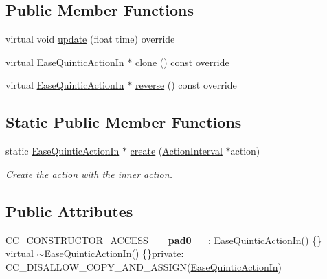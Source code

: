 \subsection*{Public Member Functions}
\begin{DoxyCompactItemize}
\item 
virtual void \hyperlink{classEaseQuinticActionIn_a168f914597d873e6071d39118f2cf9f5}{update} (float time) override
\item 
virtual \hyperlink{classEaseQuinticActionIn}{Ease\+Quintic\+Action\+In} $\ast$ \hyperlink{classEaseQuinticActionIn_a181a8206b5d3bd9aedf4c8ba88087c6c}{clone} () const override
\item 
virtual \hyperlink{classEaseQuinticActionIn}{Ease\+Quintic\+Action\+In} $\ast$ \hyperlink{classEaseQuinticActionIn_a7f99df08baa80e8f09e0fbde4d143696}{reverse} () const override
\end{DoxyCompactItemize}
\subsection*{Static Public Member Functions}
\begin{DoxyCompactItemize}
\item 
static \hyperlink{classEaseQuinticActionIn}{Ease\+Quintic\+Action\+In} $\ast$ \hyperlink{classEaseQuinticActionIn_a4dd41d1c68590ebbf128172b079b89ba}{create} (\hyperlink{classActionInterval}{Action\+Interval} $\ast$action)
\begin{DoxyCompactList}\small\item\em Create the action with the inner action. \end{DoxyCompactList}\end{DoxyCompactItemize}
\subsection*{Public Attributes}
\begin{DoxyCompactItemize}
\item 
\mbox{\label{classEaseQuinticActionIn_a4c7eb78b6a7f0ba32c879d0ddb395c49}} 
\hyperlink{_2cocos2d_2cocos_2base_2ccConfig_8h_a25ef1314f97c35a2ed3d029b0ead6da0}{C\+C\+\_\+\+C\+O\+N\+S\+T\+R\+U\+C\+T\+O\+R\+\_\+\+A\+C\+C\+E\+SS} {\bfseries \+\_\+\+\_\+pad0\+\_\+\+\_\+}\+: \hyperlink{classEaseQuinticActionIn}{Ease\+Quintic\+Action\+In}() \{\} virtual $\sim$\hyperlink{classEaseQuinticActionIn}{Ease\+Quintic\+Action\+In}() \{\}private\+: C\+C\+\_\+\+D\+I\+S\+A\+L\+L\+O\+W\+\_\+\+C\+O\+P\+Y\+\_\+\+A\+N\+D\+\_\+\+A\+S\+S\+I\+GN(\hyperlink{classEaseQuinticActionIn}{Ease\+Quintic\+Action\+In})
\end{DoxyCompactItemize}
